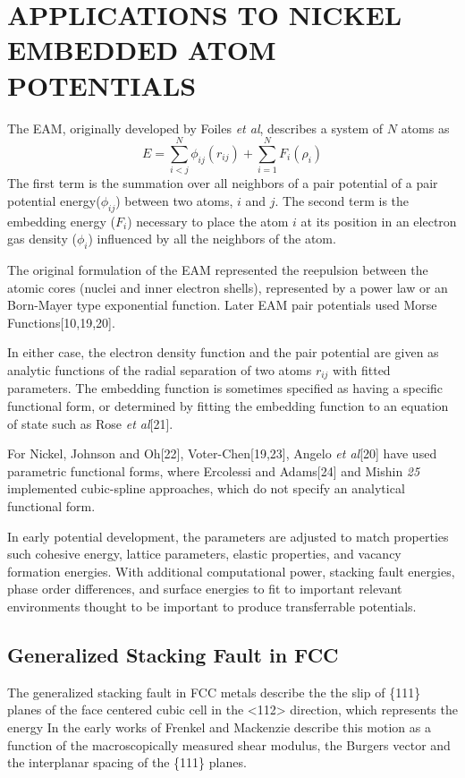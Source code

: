\chapter{APPLICATIONS TO NICKEL EMBEDDED ATOM POTENTIALS}

The EAM, originally developed by Foiles \emph{et al}, describes a system of $N$ atoms as
\begin{equation}
  E=\sum_{i<j}^{N}\phi_{ij}(r_{ij})
    +\sum_{i=1}^{N}F_{i}(\rho_{i})
\end{equation}
The first term is the summation over all neighbors of a pair potential of a pair potential energy($\phi_{ij}$) between two atoms, $i$ and $j$.  The second term is the embedding energy ($F_i$) necessary to place the atom $i$ at its position in an electron gas density ($\phi_i$) influenced by all the neighbors of the atom.

The original formulation of the EAM represented the reepulsion between the atomic cores (nuclei and inner electron shells), represented by a power law or an Born-Mayer type exponential function.  Later EAM pair potentials used Morse Functions[10,19,20].

In either case, the electron density function and the pair potential are given as analytic functions of the radial separation of two atoms $r_{ij}$ with fitted parameters.  The embedding function is sometimes specified as having a specific functional form, or determined by fitting the embedding function to an equation of state such as Rose \emph{et al}[21].

For Nickel, Johnson and Oh[22], Voter-Chen[19,23], Angelo \emph{et al}[20] have used parametric functional forms, where Ercolessi and Adams[24] and Mishin \emph{25} implemented cubic-spline approaches, which do not specify an analytical functional form.

In early potential development, the parameters are adjusted to match properties such cohesive energy, lattice parameters, elastic properties, and vacancy formation energies.  With additional computational power, stacking fault energies, phase order differences, and surface energies to fit to important relevant environments thought to be important to produce transferrable potentials.

\section{Generalized Stacking Fault in FCC}
The generalized stacking fault in FCC metals describe the the slip of \{111\} planes of the face centered cubic cell in the <112> direction, which represents the energy
In the early works of Frenkel and Mackenzie describe this motion as a function of the macroscopically measured shear modulus, the Burgers vector and the interplanar spacing of the \{111\} planes.

